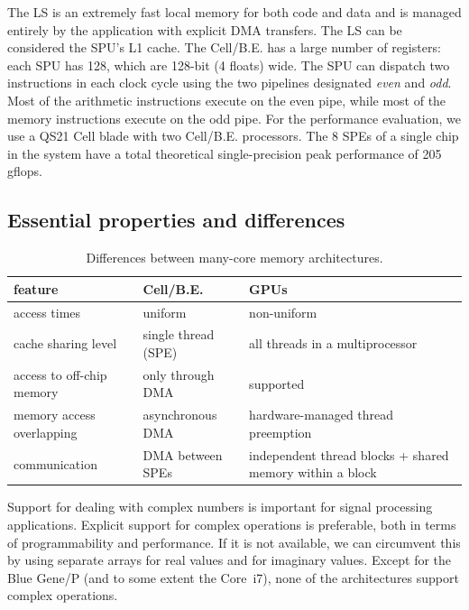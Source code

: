 \documentclass{article}
\begin{document}
The LS is an extremely fast local memory for both code and data
and is managed entirely by the application with explicit DMA
transfers.  The LS can be considered the SPU's L1 cache.  The
\mbox{Cell/B.E.} has a large number of registers: each SPU has 128,
which are 128-bit (4 floats) wide.  The SPU can dispatch two
instructions in each clock cycle using the two pipelines designated
\emph{even} and \emph{odd}. Most of the arithmetic instructions
execute on the even pipe, while most of the memory instructions
execute on the odd pipe.  For the performance evaluation, we use a QS21 Cell blade with two
\mbox{Cell/B.E.} processors.  The 8 SPEs of a single chip in the
system have a total theoretical single-precision peak performance of
205 gflops.




\subsection{Essential properties and differences}

\begin{table}[t]
\begin{center}
{\small
\begin{tabular}{|l|l|l|}
\hline
feature                   & Cell/B.E.                      & GPUs \\
\hline
access times              & uniform                        & non-uniform \\
cache sharing level       & single thread (SPE)            & all threads in a multiprocessor \\
access to off-chip memory & only through DMA               & supported \\
memory access overlapping & asynchronous DMA               & hardware-managed thread preemption \\
communication             & DMA between SPEs               & independent thread blocks + shared memory within a block \\
\hline
\end{tabular}
} %
\end{center}
\vspace{-0.5cm}
\caption{Differences between many-core memory architectures.}
\label{memory-properties}
\end{table}

Support for dealing with complex numbers is important for signal
processing applications. Explicit support for complex operations is
preferable, both in terms of programmability and performance.  If it
is not available, we can circumvent this by using separate arrays for
real values and for imaginary values.  Except for the Blue Gene/P (and
to some extent the Core~i7), none of the architectures support
complex operations.
\end{document}

